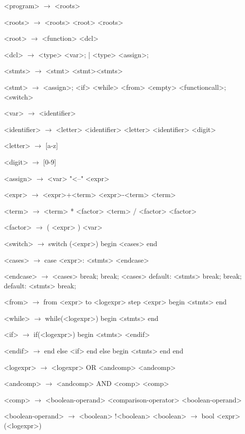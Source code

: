 \documentclass{article}
\begin{document}
\begin{grammar}
<program> $\rightarrow$ <roots>

<roots> $\rightarrow$ <roots>
\alt <root> <roots>

<root> $\rightarrow$ <function>
\alt <dcl>

<dcl> $\rightarrow$ <type> <var>;
| <type> <assign>;

<stmts> $\rightarrow$ <stmt>
	\alt <stmt><stmts>

<stmt> $\rightarrow$ <assign>;
	\alt <if>
	\alt <while>
	\alt <from>
	\alt <empty>
	\alt <functioncall>;
	\alt <switch>

<var> $\rightarrow$ <identifier>

<identifier> $\rightarrow$ <letter>
	\alt<identifier> <letter>
	\alt<identifier> <digit>

<letter> $\rightarrow$ [a-z]
	\alt [A-Z]

<digit> $\rightarrow$ [0-9]

<assign>  $\rightarrow$ <var> "<--" <expr>

<expr> $\rightarrow$ <expr>+<term>
	\alt<expr>-<term>
	\alt<term>

<term> $\rightarrow$ <term> * <factor>
	\alt <term> / <factor>
	\alt <factor>

<factor> $\rightarrow$ ( <expr> )
	\alt <var>

<switch> $\rightarrow$ switch (<expr>)
		begin
			<cases>
		end

<cases> $\rightarrow$ case <expr>:
			<stmts>
		<endcase>
		
<endcase> $\rightarrow$ <cases>
		\alt break;
		\alt break;
		<cases>
		\alt default:
			<stmts>
			break;
		\alt break;
		default:
			<stmts>
			break;

<from> $\rightarrow$ from <expr> to <logexpr> step <expr>
	begin
		<stmts>
	end 

<while> $\rightarrow$ while(<logexpr>)
		begin
			<stmts>
		end

<if> $\rightarrow$ if(<logexpr>)
	begin
		<stmts>
	<endif>

<endif> $\rightarrow$ end
	else <if>
	\alt end
	else
	begin
		<stmts>
	end
	\alt end

<logexpr> $\rightarrow$ <logexpr> OR <andcomp>
		\alt <andcomp>

<andcomp> $\rightarrow$ <andcomp> AND <comp>

<comp> $\rightarrow$ <boolean-operand> <comparison-operator> <boolean-operand>

<boolean-operand> $\rightarrow$ <boolean>
		\alt !<boolean>
<boolean> $\rightarrow$ bool
		\alt (<logexpr>)


\end{grammar}
\end{document}

